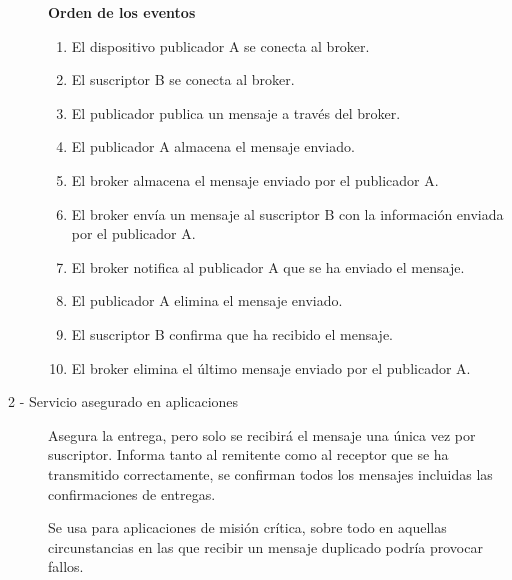 \documentclass[12pt, twoside, openright]{report} %
\begin{document}
\begin{description}
	      \textbf{Orden de los eventos}
	      \begin{enumerate}
		      \item El dispositivo publicador A se conecta al broker.
		      \item El suscriptor B se conecta al broker.
		      \item El publicador publica un mensaje a través del broker.
		      \item El publicador A almacena el mensaje enviado.
		      \item El broker almacena el mensaje enviado por el publicador A.
		      \item El broker envía un mensaje al suscriptor B con la información enviada por el publicador A.
		      \item El broker notifica al publicador A que se ha enviado el mensaje.
		      \item El publicador A elimina el mensaje enviado.
		      \item El suscriptor B confirma que ha recibido el mensaje.
		      \item El broker elimina el último mensaje enviado por el publicador A.
	      \end{enumerate}

	\item[2 - Servicio asegurado en aplicaciones] Asegura la entrega, pero solo se recibirá el mensaje una única vez por suscriptor. Informa tanto al remitente como al receptor que se ha transmitido correctamente, se confirman todos los mensajes incluidas las confirmaciones de entregas.

	      Se usa para aplicaciones de misión crítica, sobre todo en aquellas circunstancias en las que recibir un mensaje duplicado podría provocar fallos.


\end{description}
\end{document}
